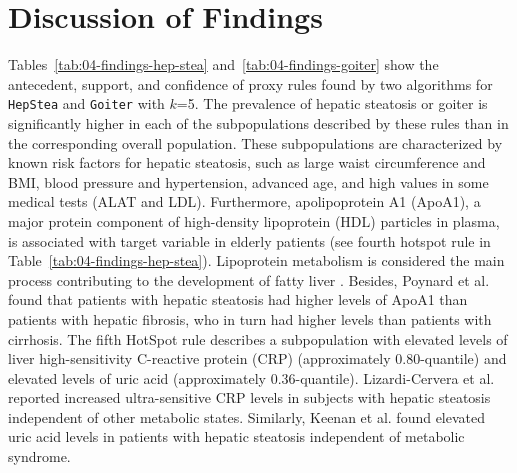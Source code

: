 \documentclass[
  oneside]{book}
\begin{document}
\hypertarget{sdclu-discussion}{%
\section{Discussion of Findings}\label{sdclu-discussion}}

Tables~\ref{tab:04-findings-hep-stea} and~\ref{tab:04-findings-goiter} show the antecedent, support, and confidence of proxy rules found by two algorithms for \texttt{HepStea} and \texttt{Goiter} with \(k\)=5.
The prevalence of hepatic steatosis or goiter is significantly higher in each of the subpopulations described by these rules than in the corresponding overall population.
These subpopulations are characterized by known risk factors for hepatic steatosis, such as large waist circumference and BMI, blood pressure and hypertension, advanced age, and high values in some medical tests (ALAT and LDL).
Furthermore, apolipoprotein A1 (ApoA1), a major protein component of high-density lipoprotein (HDL) particles in plasma, is associated with target variable in elderly patients (see fourth hotspot rule in Table~\ref{tab:04-findings-hep-stea}).
Lipoprotein metabolism is considered the main process contributing to the development of fatty liver \autocite{jiang2013lipoprotein}.
Besides, Poynard et al. \autocite{poynard1986apolipoprotein} found that patients with hepatic steatosis had higher levels of ApoA1 than patients with hepatic fibrosis, who in turn had higher levels than patients with cirrhosis.
The fifth HotSpot rule describes a subpopulation with elevated levels of liver high-sensitivity C-reactive protein (CRP) (approximately 0.80-quantile) and elevated levels of uric acid (approximately 0.36-quantile).
Lizardi-Cervera et al. \autocite{lizardi2007association} reported increased ultra-sensitive CRP levels in subjects with hepatic steatosis independent of other metabolic states.
Similarly, Keenan et al. \autocite{keenan2012relation} found elevated uric acid levels in patients with hepatic steatosis independent of metabolic syndrome.
\end{document}
